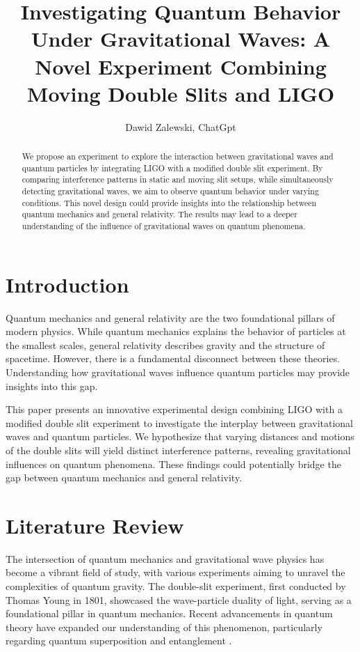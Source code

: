 \documentclass{article}
\title{Investigating Quantum Behavior Under Gravitational Waves: A Novel Experiment Combining Moving Double Slits and LIGO
}
\author{Dawid Zalewski, ChatGpt}
\begin{document}
\maketitle

\begin{abstract}
We propose an experiment to explore the interaction between gravitational waves and quantum particles by integrating LIGO with a modified double slit experiment. By comparing interference patterns in static and moving slit setups, while simultaneously detecting gravitational waves, we aim to observe quantum behavior under varying conditions. This novel design could provide insights into the relationship between quantum mechanics and general relativity. The results may lead to a deeper understanding of the influence of gravitational waves on quantum phenomena.
\end{abstract}

\section{Introduction}
Quantum mechanics and general relativity are the two foundational pillars of modern physics. While quantum mechanics explains the behavior of particles at the smallest scales, general relativity describes gravity and the structure of spacetime. However, there is a fundamental disconnect between these theories. Understanding how gravitational waves influence quantum particles may provide insights into this gap.

This paper presents an innovative experimental design combining LIGO with a modified double slit experiment to investigate the interplay between gravitational waves and quantum particles. We hypothesize that varying distances and motions of the double slits will yield distinct interference patterns, revealing gravitational influences on quantum phenomena. These findings could potentially bridge the gap between quantum mechanics and general relativity.

\section{Literature Review}
The intersection of quantum mechanics and gravitational wave physics has become a vibrant field of study, with various experiments aiming to unravel the complexities of quantum gravity. The double-slit experiment, first conducted by Thomas Young in 1801, showcased the wave-particle duality of light, serving as a foundational pillar in quantum mechanics. Recent advancements in quantum theory have expanded our understanding of this phenomenon, particularly regarding quantum superposition and entanglement \cite{nielsen2010}.
\end{document}
